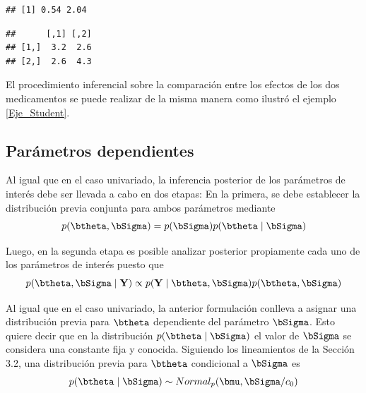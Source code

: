 \begin{Eje}
\begin{knitrout}
\color{fgcolor}\begin{kframe}
\begin{alltt}
 \hlkwb{<-} 
 \hlkwb{<-} \hlstd{(}\hlstd{(}\hlstd{(Sigma.pos[,}\hlstd{,}\hlstd{]),}\hlstd{(Sigma.pos[,}\hlstd{,}\hlstd{]),}\hlstd{(Sigma.pos[,}\hlstd{,}\hlstd{]),}\hlstd{(Sigma.pos[,}\hlstd{,}\hlstd{])),}\hlstd{,}\hlstd{)}
\end{alltt}
\begin{verbatim}
## [1] 0.54 2.04
\end{verbatim}
\begin{alltt}
\end{alltt}
\begin{verbatim}
##      [,1] [,2]
## [1,]  3.2  2.6
## [2,]  2.6  4.3
\end{verbatim}
\end{kframe}
\end{knitrout}
El procedimiento inferencial sobre la comparación entre los efectos de los dos medicamentos se puede realizar de la misma manera como ilustró el ejemplo \ref{Eje_Student}.
\end{Eje}

\subsection{Parámetros dependientes}

Al igual que en el caso univariado, la inferencia posterior de los parámetros de interés debe ser llevada a cabo en dos etapas: En la primera, se debe establecer la distribución previa conjunta para ambos parámetros mediante
\begin{equation*}
p(\btheta,\bSigma)=p(\bSigma)p(\btheta \mid \bSigma)
\end{equation*}

Luego, en la segunda etapa es posible analizar posterior propiamente cada uno de los parámetros de interés puesto que
\begin{equation*}
p(\btheta,\bSigma \mid \mathbf{Y})\propto p(\mathbf{Y} \mid \btheta,\bSigma)p(\btheta,\bSigma)
\end{equation*}

Al igual que en el caso univariado, la anterior formulación conlleva a asignar una distribución previa para $\btheta$ dependiente del parámetro $\bSigma$. Esto quiere decir que en la distribución $p(\btheta \mid \bSigma)$ el valor de $\bSigma$ se considera una constante fija y conocida. Siguiendo los lineamientos de la Sección 3.2, una distribución previa para $\btheta$  condicional a $\bSigma$ es
\begin{equation*}
p(\btheta \mid \bSigma)\sim Normal_p(\bmu,\bSigma/c_0)
\end{equation*}

